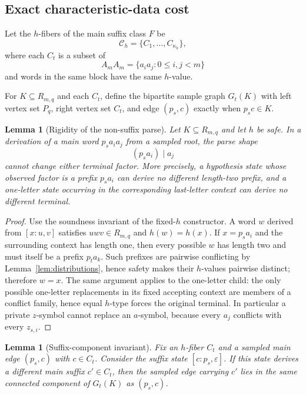 \documentclass[11pt]{article}
\newtheorem{lemma}[definition]{Lemma}
\newcommand{\eps}{\varepsilon}
\begin{document}
\subsection{Exact characteristic-data cost}

Let the $h$-fibers of the main suffix class $F$ be
\[
 \mathcal C_h=\{C_1,\ldots,C_{\kappa_h}\},
\]
where each $C_t$ is a subset of
\[
 A_mA_m=\{a_i a_j:0\le i,j<m\}
\]
and words in the same block have the same $h$-value.

For $K\subseteq R_{m,q}$ and each $C_t$, define the bipartite sample graph
$G_t(K)$ with left vertex set $P_q$, right vertex set $C_t$, and edge
$(p_s,c)$ exactly when $p_sc\in K$.

\begin{lemma}[Rigidity of the non-suffix parse]
\label{lem:rigid-parse}
Let $K\subseteq R_{m,q}$ and let $h$ be safe.  In a derivation of a main word
$p_sa_i a_j$ from a sampled root, the parse shape
\[
 (p_sa_i)\mid a_j
\]
cannot change either terminal factor.  More precisely, a hypothesis state
whose observed factor is a prefix $p_sa_i$ can derive no different length-two
prefix, and a one-letter state occurring in the corresponding last-letter
context can derive no different terminal.
\end{lemma}

\begin{proof}
Use the soundness invariant of the fixed-$h$ constructor.  A word $w$ derived
from $[x:u,v]$ satisfies $uwv\in R_{m,q}$ and $h(w)=h(x)$.  If $x=p_sa_i$
and the surrounding context has length one, then every possible $w$ has length
two and must itself be a prefix $p_ta_k$.  Such prefixes are pairwise
conflicting by Lemma~\ref{lem:distributions}, hence safety makes their
$h$-values pairwise distinct; therefore $w=x$.  The same argument applies to
the one-letter child: the only possible one-letter replacements in its fixed
accepting context are members of a conflict family, hence equal $h$-type
forces the original terminal.  In particular a private $z$-symbol cannot
replace an $a$-symbol, because every $a_j$ conflicts with every $z_{s,i}$.
\end{proof}

\begin{lemma}[Suffix-component invariant]
\label{lem:suffix-component}
Fix an $h$-fiber $C_t$ and a sampled main edge $(p_s,c)$ with $c\in C_t$.
Consider the suffix state $[c:p_s,\eps]$.  If this state derives a different
main suffix $c'\in C_t$, then the sampled edge carrying $c'$ lies in the same
connected component of $G_t(K)$ as $(p_s,c)$.
\end{lemma}
\end{document}
